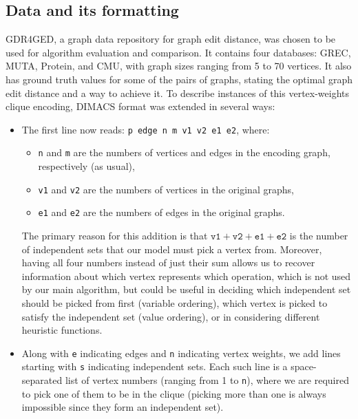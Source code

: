 \documentclass{article}
\theoremstyle{definition}
\begin{document}
\subsection{Data and its formatting}
GDR4GED, a graph data repository for graph edit distance, was chosen to be used for algorithm evaluation and comparison. It contains four databases: GREC, MUTA, Protein, and CMU, with graph sizes ranging from 5 to 70 vertices. It also has ground truth values for some of the pairs of graphs, stating the optimal graph edit distance and a way to achieve it. To describe instances of this vertex-weights clique encoding, DIMACS format was extended in several ways:
\begin{itemize}
\item The first line now reads: \texttt{p edge n m v1 v2 e1 e2}, where:
  \begin{itemize}
  \item \texttt{n} and \texttt{m} are the numbers of vertices and edges in the encoding graph, respectively (as usual),
  \item \texttt{v1} and \texttt{v2} are the numbers of vertices in the original graphs,
  \item \texttt{e1} and \texttt{e2} are the numbers of edges in the original graphs.
  \end{itemize}
  The primary reason for this addition is that $\texttt{v1}+\texttt{v2}+\texttt{e1}+\texttt{e2}$ is the number of independent sets that our model must pick a vertex from. Moreover, having all four numbers instead of just their sum allows us to recover information about which vertex represents which operation, which is not used by our main algorithm, but could be useful in deciding which independent set should be picked from first (variable ordering), which vertex is picked to satisfy the independent set (value ordering), or in considering different heuristic functions.
  \item Along with \texttt{e} indicating edges and \texttt{n} indicating vertex weights, we add lines starting with \texttt{s} indicating independent sets. Each such line is a space-separated list of vertex numbers (ranging from 1 to \texttt{n}), where we are required to pick one of them to be in the clique (picking more than one is always impossible since they form an independent set).
\end{itemize}
\end{document}

